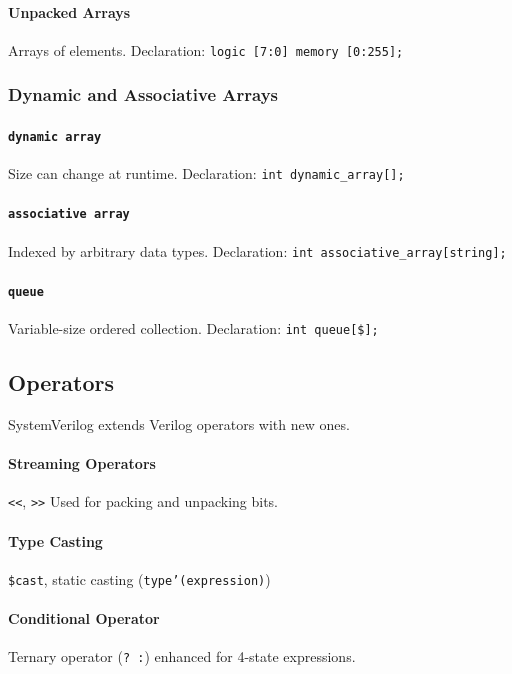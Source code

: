 \paragraph{\textbf{Unpacked Arrays}} Arrays of elements. Declaration: \texttt{logic [7:0] memory [0:255];}

\subsubsection{Dynamic and Associative Arrays}
\paragraph{\texttt{dynamic array}} Size can change at runtime. Declaration: \texttt{int dynamic\_array[];}

\paragraph{\texttt{associative array}} Indexed by arbitrary data types. Declaration: \texttt{int associative\_array[string];}

\paragraph{\texttt{queue}} Variable-size ordered collection. Declaration: \texttt{int queue[\$];}

\subsection{Operators}
SystemVerilog extends Verilog operators with new ones.

\paragraph{\textbf{Streaming Operators}} \texttt{<<}, \texttt{>>} Used for packing and unpacking bits.

\paragraph{\textbf{Type Casting}} \texttt{\$cast}, static casting (\texttt{type'(expression)})

\paragraph{\textbf{Conditional Operator}} Ternary operator (\texttt{? :}) enhanced for 4-state expressions.

